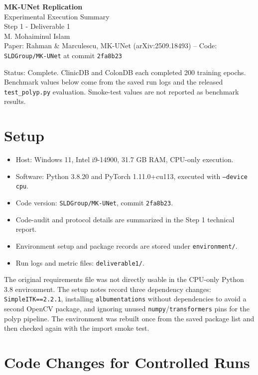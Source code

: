 \documentclass[10pt,a4paper]{article}
\begin{document}
\begin{center}
{\LARGE\bfseries MK-UNet Replication}\\[3pt]
{\large Experimental Execution Summary}\\[4pt]
{\small Step 1 - Deliverable 1}\\[3pt]
{\normalsize M. Mohaiminul Islam}\\[3pt]
{\footnotesize Paper: Rahman \& Marculescu, MK-UNet (arXiv:2509.18493) \quad--\quad
Code: \texttt{SLDGroup/MK-UNet} at commit \texttt{2fa8b23}}
\end{center}
\vspace{0.25em}

\noindent Status: Complete. ClinicDB and ColonDB each completed 200 training epochs. Benchmark values below come from the saved run logs and the released \texttt{test\_polyp.py} evaluation. Smoke-test values are not reported as benchmark results.

\section{Setup}

\begin{itemize}
\item Host: Windows 11, Intel i9-14900, 31.7 GB RAM, CPU-only execution.
\item Software: Python 3.8.20 and PyTorch 1.11.0+cu113, executed with \texttt{--device cpu}.
\item Code version: \texttt{SLDGroup/MK-UNet}, commit \texttt{2fa8b23}.
\item Code-audit and protocol details are summarized in the Step 1 technical report.
\item Environment setup and package records are stored under \texttt{environment/}.
\item Run logs and metric files: \texttt{deliverable1/}.
\end{itemize}

The original requirements file was not directly usable in the CPU-only Python 3.8 environment. The setup notes record three dependency changes: \texttt{SimpleITK==2.2.1}, installing \texttt{albumentations} without dependencies to avoid a second OpenCV package, and ignoring unused \texttt{numpy}/\texttt{transformers} pins for the polyp pipeline. The environment was rebuilt once from the saved package list and then checked again with the import smoke test.

\section{Code Changes for Controlled Runs}
\end{document}
